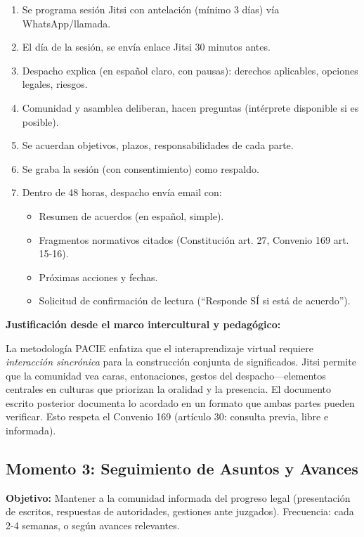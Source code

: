 ﻿\documentclass[
  spanish,
  letterpaper, oneside
]{article}
\begin{document}
\begin{enumerate}
  \item Se programa sesión Jitsi con antelación (mínimo 3 días) vía WhatsApp/llamada.
  \item El día de la sesión, se envía enlace Jitsi 30 minutos antes.
  \item Despacho explica (en español claro, con pausas): derechos aplicables, opciones legales, riesgos.
  \item Comunidad y asamblea deliberan, hacen preguntas (intérprete disponible si es posible).
  \item Se acuerdan objetivos, plazos, responsabilidades de cada parte.
  \item Se graba la sesión (con consentimiento) como respaldo.
  \item Dentro de 48 horas, despacho envía email con:
    \begin{itemize}
      \item Resumen de acuerdos (en español, simple).
      \item Fragmentos normativos citados (Constitución art. 27, Convenio 169 art. 15-16).
      \item Próximas acciones y fechas.
      \item Solicitud de confirmación de lectura (``Responde SÍ si está de acuerdo'').
    \end{itemize}
\end{enumerate}

\textbf{Justificación desde el marco intercultural y pedagógico:}

La metodología PACIE \cite{cushpa2022pacie} enfatiza que el interaprendizaje virtual 
requiere \textit{interacción sincrónica} para la construcción conjunta de significados. 
Jitsi permite que la comunidad vea caras, entonaciones, gestos del despacho—elementos 
centrales en culturas que priorizan la oralidad y la presencia. El documento escrito 
posterior documenta lo acordado en un formato que ambas partes pueden verificar. 
Esto respeta el Convenio 169 (artículo 30: consulta previa, libre e informada).

\subsection{Momento 3: Seguimiento de Asuntos y Avances}

\textbf{Objetivo:} Mantener a la comunidad informada del progreso legal (presentación de 
escritos, respuestas de autoridades, gestiones ante juzgados). Frecuencia: cada 2-4 semanas, 
o según avances relevantes.
\end{document}
